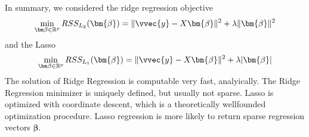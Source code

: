\documentclass[letterpaper,10pt,english]{jupyterBook}
\begin{document}
\sphinxAtStartPar
In summary, we considered the ridge regression objective
\label{equation:regression_L1vsL2:c52348b4-3303-4ce9-afaf-3b9c9d6d4d30}\begin{align}
        \min_{\bm\beta\in\mathbb{R}^p} RSS_{L_2}(\bm{\beta}) = \lVert \vvec{y}-X\bm{\beta}\rVert^2 + \lambda\lVert\bm{\beta}\rVert^2
\end{align}
\sphinxAtStartPar
and the Lasso
\label{equation:regression_L1vsL2:be0db8ec-3bdd-4f38-8f04-25e29eb0308e}\begin{align}
    \min_{\bm\beta\in\mathbb{R}^p} RSS_{L_1}(\bm{\beta}) = \lVert \vvec{y}-X\bm{\beta}\rVert^2 + \lambda\lvert\bm{\beta}\rvert
\end{align}
\sphinxAtStartPar
The solution of Ridge Regression is computable very fast, analyically. The Ridge Regression minimizer is uniquely defined, but usually not sparse.
Lasso is optimized with coordinate descent, which is a theoretically well\sphinxhyphen{}founded optimization procedure. Lasso regression is more likely to return sparse regression vectors \(\bm\beta\).

\sphinxstepscope
\end{document}
